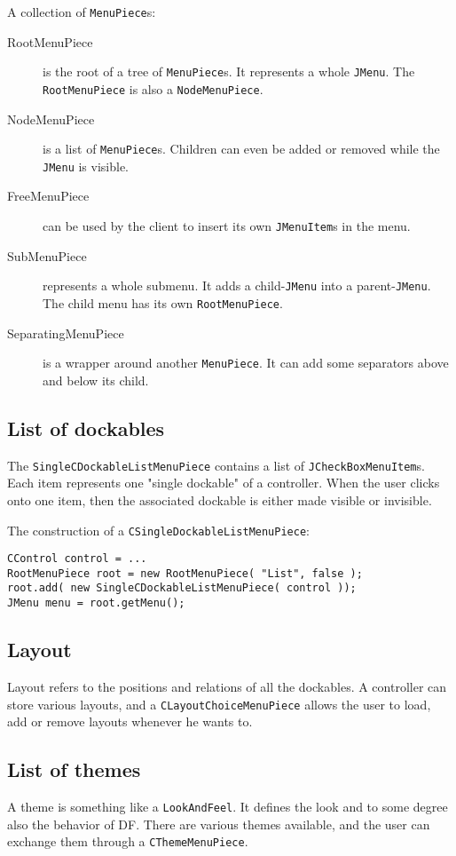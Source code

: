 \documentclass[a4paper,10pt]{article}
\newcommand{\src}[1]{\lstinline[basicstyle=\ttfamily]|#1|}
\begin{document}
A collection of \src{MenuPiece}s:
\begin{description}
 \item[RootMenuPiece] is the root of a tree of \src{MenuPiece}s. It represents a whole \src{JMenu}. The \src{RootMenuPiece} is also a \src{NodeMenuPiece}.
 \item[NodeMenuPiece] is a list of \src{MenuPiece}s. Children can even be added or removed while the \src{JMenu} is visible.
 \item[FreeMenuPiece] can be used by the client to insert its own \src{JMenuItem}s in the menu.
 \item[SubMenuPiece] represents a whole submenu. It adds a child-\src{JMenu} into a parent-\src{JMenu}. The child menu has its own \src{RootMenuPiece}.
 \item[SeparatingMenuPiece] is a wrapper around another \src{MenuPiece}. It can add some separators above and below its child.
\end{description}

\subsection{List of dockables}
The \src{SingleCDockableListMenuPiece} contains a list of \src{JCheckBoxMenuItem}s. Each item represents one "single dockable" of a controller. When the user clicks onto one item, then the associated dockable is either made visible or invisible.

The construction of a \src{CSingleDockableListMenuPiece}:
\begin{lstlisting}
CControl control = ...
RootMenuPiece root = new RootMenuPiece( "List", false );
root.add( new SingleCDockableListMenuPiece( control ));
JMenu menu = root.getMenu();
\end{lstlisting}

\subsection{Layout}
Layout refers to the positions and relations of all the dockables. A controller can store various layouts, and a \src{CLayoutChoiceMenuPiece} allows the user to load, add or remove layouts whenever he wants to.

\subsection{List of themes}
A theme is something like a \src{LookAndFeel}. It defines the look and to some degree also the behavior of DF. There are various themes available, and the user can exchange them through a \src{CThemeMenuPiece}.
\end{document}
